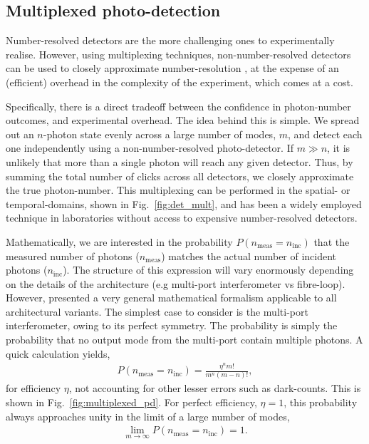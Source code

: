 %
%

\subsection{Multiplexed photo-detection}

Number-resolved detectors are the more challenging ones to experimentally realise. However, using multiplexing techniques, non-number-resolved detectors can be used to closely approximate number-resolution \cite{bib:Fitch03, bib:Banaszek03, bib:Achilles04, bib:RohdeCompDet07}, at the expense of an (efficient) overhead in the complexity of the experiment, which comes at a cost. 

Specifically, there is a direct tradeoff between the confidence in photon-number outcomes, and experimental overhead. The idea behind this is simple. We spread out an $n$-photon state evenly across a large number of modes, $m$, and detect each one independently using a non-number-resolved photo-detector. If \mbox{$m\gg n$}, it is unlikely that more than a single photon will reach any given detector. Thus, by summing the total number of clicks across all detectors, we closely approximate the true photon-number. This multiplexing can be performed in the spatial- or temporal-domains, shown in Fig.~\ref{fig:det_mult}, and has been a widely employed technique in laboratories without access to expensive number-resolved detectors.

Mathematically, we are interested in the probability \mbox{$P(n_\mathrm{meas}=n_\mathrm{inc})$} that the measured number of photons ($n_\mathrm{meas}$) matches the actual number of incident photons ($n_\mathrm{inc}$). The structure of this expression will vary enormously depending on the details of the architecture (e.g multi-port interferometer vs fibre-loop). However, \cite{rohdeHuntington} presented a very general mathematical formalism applicable to all architectural variants. The simplest case to consider is the multi-port interferometer, owing to its perfect symmetry. The probability is simply the probability that no output mode from the multi-port contain multiple photons. A quick calculation yields,
\begin{align}
	P(n_\mathrm{meas}=n_\mathrm{inc}) = \frac{\eta^n m!}{m^n(m-n)!},
\end{align}
for efficiency $\eta$, not accounting for other lesser errors such as dark-counts. This is shown in Fig.~\ref{fig:multiplexed_pd}. For perfect efficiency, \mbox{$\eta=1$}, this probability always approaches unity in the limit of a large number of modes,
\begin{align}
\lim_{m\to\infty}P(n_\mathrm{meas}=n_\mathrm{inc})=1.
\end{align}

